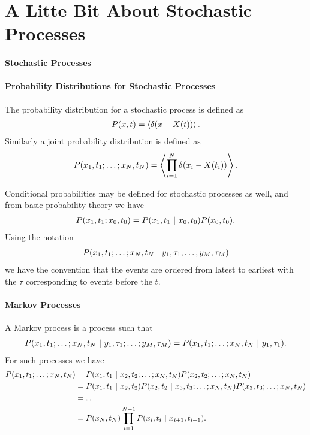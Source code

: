 \section{A Litte Bit About Stochastic Processes}

\paragraph{Stochastic Processes}

\paragraph{Probability Distributions for Stochastic Processes}
The probability distribution for a stochastic process is defined as
\begin{align*}
	P(x, t) = \expval{\delta(x - X(t))}.
\end{align*}
Similarly a joint probability distribution is defined as
\begin{align*}
	P(x_{1}, t_{1}; \dots; x_{N}, t_{N}) = \expval{\prod\limits_{i = 1}^{N}\delta(x_{i} - X(t_{i}))}.
\end{align*}

Conditional probabilities may be defined for stochastic processes as well, and from basic probability theory we have
\begin{align*}
	P(x_{1}, t_{1}; x_{0}, t_{0}) = P(x_{1}, t_{1} \ | \  x_{0}, t_{0})P(x_{0}, t_{0}).
\end{align*}
Using the notation
\begin{align*}
	P(x_{1}, t_{1}; \dots; x_{N}, t_{N} \ | \  y_{1}, \tau_{1}; \dots; y_{M}, \tau_{M})
\end{align*}
we have the convention that the events are ordered from latest to earliest with the $\tau$ corresponding to events before the $t$.

\paragraph{Markov Processes}
A Markov process is a process such that
\begin{align*}
	P(x_{1}, t_{1}; \dots; x_{N}, t_{N} \ | \  y_{1}, \tau_{1}; \dots; y_{M}, \tau_{M}) = P(x_{1}, t_{1}; \dots; x_{N}, t_{N} \ | \  y_{1}, \tau_{1}).
\end{align*}
For such processes we have
\begin{align*}
	P(x_{1}, t_{1}; \dots; x_{N}, t_{N}) &= P(x_{1}, t_{1} \ | \  x_{2}, t_{2}; \dots; x_{N}, t_{N})P(x_{2}, t_{2}; \dots; x_{N}, t_{N}) \\
	                                     &= P(x_{1}, t_{1} \ | \  x_{2}, t_{2})P(x_{2}, t_{2} \ | \  x_{3}, t_{3}; \dots; x_{N}, t_{N})P(x_{3}, t_{3}; \dots; x_{N}, t_{N}) \\
	                                     &= \dots \\
	                                     &= P(x_{N}, t_{N})\prod\limits_{i = 1}^{N - 1}P(x_{i}, t_{i} \ | \  x_{i + 1}, t_{i + 1}).
\end{align*}

